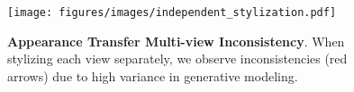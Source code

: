 \begin{figure}[t!]
    \centering

        \texttt{[image: figures/images/independent\_stylization.pdf]}

\caption{\textbf{Appearance Transfer Multi-view Inconsistency}. When stylizing each view separately, we observe inconsistencies (red arrows) due to high variance in generative modeling.} 
\label{fig:inconsistency}
\end{figure}
